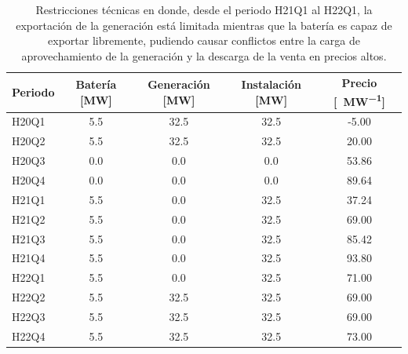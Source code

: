 \begin{table}[ht]
  \centering
  \begin{tabular}{|l|S[table-format=4.1]|S[table-format=4.1]|S[table-format=4.1]|S[table-format=4.2]|}
    \hline
    Periodo & {Batería [\si{\mega\watt}]}  & {Generación [\si{\mega\watt}]}  & {Instalación [\si{\mega\watt}]}  & {Precio [\si{\text{\euro}\per\mega\watt}]} \\
    \hline
    H20Q1   & 5.5                          & 32.5                            & 32.5                             & -5.00                                      \\
    H20Q2   & 5.5                          & 32.5                            & 32.5                             & 20.00                                      \\
    H20Q3   & 0.0                          & 0.0                             & 0.0                              & 53.86                                      \\
    H20Q4   & 0.0                          & 0.0                             & 0.0                              & 89.64                                      \\
    H21Q1   & 5.5                          & 0.0                             & 32.5                             & 37.24                                      \\
    H21Q2   & 5.5                          & 0.0                             & 32.5                             & 69.00                                      \\
    H21Q3   & 5.5                          & 0.0                             & 32.5                             & 85.42                                      \\
    H21Q4   & 5.5                          & 0.0                             & 32.5                             & 93.80                                      \\
    H22Q1   & 5.5                          & 0.0                             & 32.5                             & 71.00                                      \\
    H22Q2   & 5.5                          & 32.5                            & 32.5                             & 69.00                                      \\
    H22Q3   & 5.5                          & 32.5                            & 32.5                             & 69.00                                      \\
    H22Q4   & 5.5                          & 32.5                            & 32.5                             & 73.00                                      \\
    \hline
  \end{tabular}
  \caption{Restricciones técnicas en donde, desde el periodo H21Q1 al H22Q1, la exportación de la generación está limitada mientras que la batería es capaz de exportar libremente, pudiendo causar conflictos entre la carga de aprovechamiento de la generación y la descarga de la venta en precios altos.}
  \label{tab:carga-descarga-simultanea}
\end{table}

